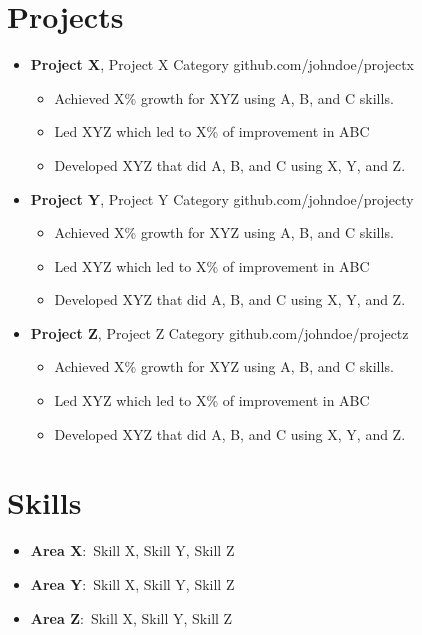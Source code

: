 \documentclass[12pt,a4paper]{article}
\begin{document}
\section{Projects}
\begin{itemize}[leftmargin=0cm, topsep=-2em, itemsep=-0.0em, label={}]
\item \textbf{Project X}, Project X Category \hfill github.com/johndoe/projectx
\begin{itemize}[leftmargin=*, topsep=-2em, itemsep=-0.7em, label=\textbullet]
\item Achieved X\% growth for XYZ using A, B, and C skills.
\item Led XYZ which led to X\% of improvement in ABC
\item Developed XYZ that did A, B, and C using X, Y, and Z.
\end{itemize}
\item \textbf{Project Y}, Project Y Category \hfill github.com/johndoe/projecty
\begin{itemize}[leftmargin=*, topsep=-2em, itemsep=-0.7em, label=\textbullet]
\item Achieved X\% growth for XYZ using A, B, and C skills.
\item Led XYZ which led to X\% of improvement in ABC
\item Developed XYZ that did A, B, and C using X, Y, and Z.
\end{itemize}
\item \textbf{Project Z}, Project Z Category \hfill github.com/johndoe/projectz
\begin{itemize}[leftmargin=*, topsep=-2em, itemsep=-0.7em, label=\textbullet]
\item Achieved X\% growth for XYZ using A, B, and C skills.
\item Led XYZ which led to X\% of improvement in ABC
\item Developed XYZ that did A, B, and C using X, Y, and Z.
\end{itemize}
\end{itemize}

\section{Skills}
\begin{itemize}[leftmargin=0cm, topsep=-2em, itemsep=-0.0em, label={}]
\item \textbf{Area X}:\ {Skill X, Skill Y, Skill Z}
\item \textbf{Area Y}:\ {Skill X, Skill Y, Skill Z}
\item \textbf{Area Z}:\ {Skill X, Skill Y, Skill Z}
\end{itemize}
\end{document}
